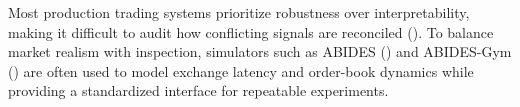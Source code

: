 \documentclass{article}
\begin{document}
Most production trading systems prioritize robustness over interpretability, making it difficult to audit how conflicting signals are reconciled (\cite{fticonsulting2023}). To balance market realism with inspection, simulators such as ABIDES (\cite{abides2019}) and ABIDES-Gym (\cite{abidesgym2021}) are often used to model exchange latency and order-book dynamics while providing a standardized interface for repeatable experiments.
\end{document}
